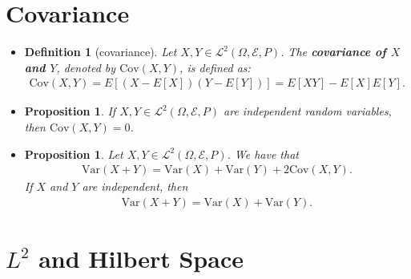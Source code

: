 \documentclass[10pt]{article}
\newtheorem{definition}[lemma]{Definition}
\newtheorem{proposition}[lemma]{Proposition}
\numberwithin{lemma}{section}
\newcommand{\Cov}{\mathrm{Cov}}
\newcommand{\Var}{\mathrm{Var}}
\newcommand{\mcal}[1]{\mathcal{#1}}
\begin{document}
\section{Covariance}

\begin{itemize}
  \item \begin{definition}[covariance]
    Let $X, Y \in \mcal{L}^2(\Omega, \mcal{E}, P)$. The {\bf covariance of $X$ and $Y$}, denoted by $\Cov(X, Y)$, is defined as:
    \begin{align*}
      \Cov(X,Y) = E[(X - E[X])(Y - E[Y])] = E[XY] - E[X]E[Y].
    \end{align*}
  \end{definition}

  \item \begin{proposition}
    If $X, Y \in \mcal{L}^2(\Omega, \mcal{E}, P)$ are independent random variables, then $\Cov(X, Y) = 0$.
  \end{proposition}

  \item \begin{proposition}
    Let $X, Y \in \mcal{L}^2(\Omega, \mcal{E}, P)$. We have that
    \begin{align*}
      \Var(X+Y) = \Var(X) + \Var(Y) + 2\Cov(X, Y).
    \end{align*}
    If $X$ and $Y$ are independent, then
    \begin{align*}
      \Var(X + Y) = \Var(X) + \Var(Y).
    \end{align*}
  \end{proposition}
\end{itemize}

\section{$L^2$ and Hilbert Space}
\end{document}
